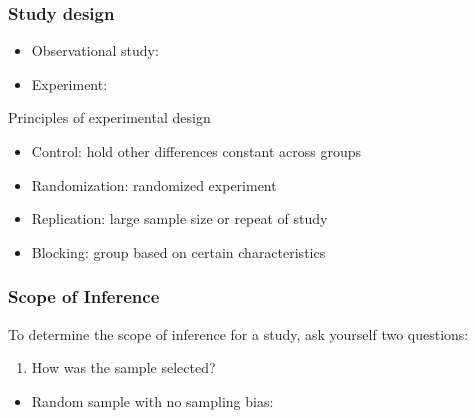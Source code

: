 \documentclass[
]{report}
\providecommand{\tightlist}{%
  \setlength{\itemsep}{0pt}\setlength{\parskip}{0pt}}
\begin{document}
\vspace{0.8in}

\subsubsection*{Study design}\label{study-design-1}

\begin{itemize}
\tightlist
\item
  Observational study:
\end{itemize}

\vspace{0.3in}

\begin{itemize}
\tightlist
\item
  Experiment:
\end{itemize}

\vspace{0.3in}

Principles of experimental design

\begin{itemize}
\item
  Control: hold other differences constant across groups
  \vspace{1mm}
\item
  Randomization: randomized experiment
  \vspace{1mm}
\item
  Replication: large sample size or repeat of study
  \vspace{1mm}
\item
  Blocking: group based on certain characteristics
  \vspace{1mm}
\end{itemize}

\subsubsection*{Scope of Inference}\label{scope-of-inference-1}

To determine the scope of inference for a study, ask yourself two questions:

\begin{enumerate}
\def\labelenumi{\arabic{enumi}.}
\tightlist
\item
  How was the sample selected?
\end{enumerate}

\begin{itemize}
\tightlist
\item
  Random sample with no sampling bias:
\end{itemize}
\end{document}
